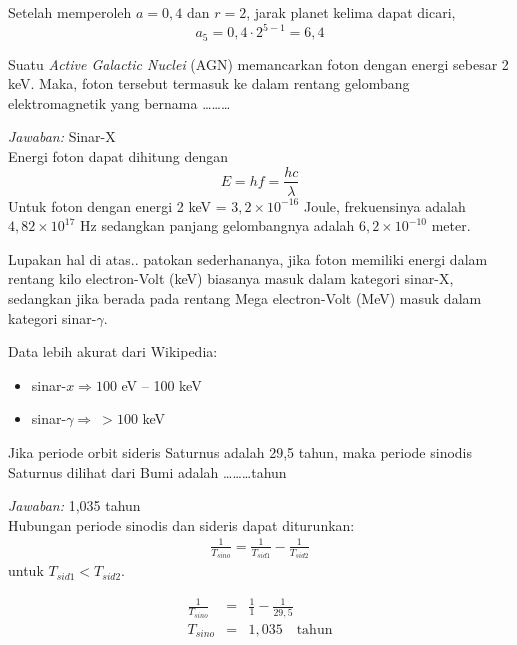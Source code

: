 \documentclass[11pt,fleqn]{exam}
\begin{document}
\begin{questions}
Setelah memperoleh $a = 0,4$ dan $r = 2$, jarak planet kelima dapat dicari,
\begin{equation*}
a_5 = 0,4 \cdot 2^{5-1} = 6,4
\end{equation*}

\question Suatu \textit{Active Galactic Nuclei} (AGN) memancarkan foton dengan energi sebesar 2 keV. Maka, foton tersebut termasuk ke dalam rentang gelombang elektromagnetik yang bernama \ldots\ldots\ldots

\textit{Jawaban: } Sinar-X\\

Energi foton dapat dihitung dengan
\begin{equation}
E = h f = \frac{h c}{\lambda}
\end{equation}
Untuk foton dengan energi 2 keV = $3,2 \times 10^{-16}$ Joule, frekuensinya adalah $4,82 \times 10^{17}$ Hz sedangkan panjang gelombangnya adalah $6,2 \times 10^{-10}$ meter.

Lupakan hal di atas.. patokan sederhananya, jika foton memiliki energi dalam rentang kilo electron-Volt (keV) biasanya masuk dalam kategori sinar-X, sedangkan jika berada pada rentang Mega electron-Volt (MeV) masuk dalam kategori sinar-$\gamma$.

Data lebih akurat dari Wikipedia:
\begin{itemize}
\item sinar-$x \Rightarrow 100$ eV \--- 100 keV
\item sinar-$\gamma \Rightarrow ~> 100$ keV\\
\end{itemize} 

\question Jika periode orbit sideris Saturnus adalah 29,5 tahun, maka periode sinodis Saturnus dilihat dari Bumi adalah \ldots\ldots\ldots tahun

\textit{Jawaban: } 1,035 tahun\\

Hubungan periode sinodis dan sideris dapat diturunkan:
\begin{eqnarray*}
\frac{1}{T_{sino}} = \frac{1}{T_{sid1}} - \frac{1}{T_{sid2}}
\end{eqnarray*}
untuk $T_{sid1} < T_{sid2}$. 

\begin{eqnarray*}
\frac{1}{T_{sino}} &=& \frac{1}{1} - \frac{1}{29,5}\\
T_{sino} &=& 1,035 \quad \text{tahun}
\end{eqnarray*}\\



\end{questions}
\end{document}
